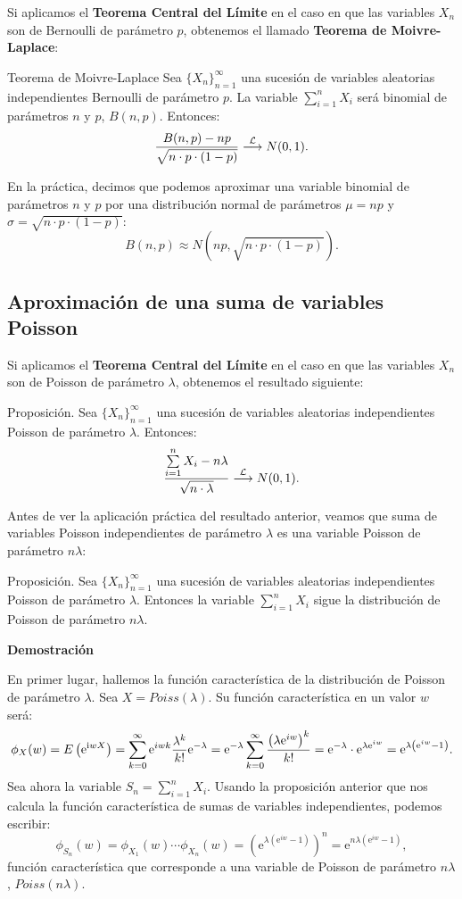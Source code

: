 \documentclass[
  letterpaper,
  DIV=11,
  numbers=noendperiod]{scrreprt}
\begin{document}
Si aplicamos el \textbf{Teorema Central del Límite} en el caso en que
las variables \(X_n\) son de Bernoulli de parámetro \(p\), obtenemos el
llamado \textbf{Teorema de Moivre-Laplace}:

Teorema de Moivre-Laplace Sea \(\{X_n\}_{n=1}^\infty\) una sucesión de
variables aleatorias independientes Bernoulli de parámetro \(p\). La
variable \(\sum\limits_{i=1}^n X_i\) será binomial de parámetros \(n\) y
\(p\), \(B(n,p)\). Entonces: \[
\frac{B(n,p)-np}{\sqrt{n\cdot p\cdot (1-p)}}\stackrel{{\cal L}}{\longrightarrow} N(0,1).
\]

En la práctica, decimos que podemos aproximar una variable binomial de
parámetros \(n\) y \(p\) por una distribución normal de parámetros
\(\mu=np\) y \(\sigma =\sqrt{n\cdot p\cdot (1-p)}\): \[
B(n,p)\approx N(np,\sqrt{n\cdot p\cdot (1-p)}).
\]

\hypertarget{aproximaciuxf3n-de-una-suma-de-variables-poisson}{%
\subsection{Aproximación de una suma de variables
Poisson}\label{aproximaciuxf3n-de-una-suma-de-variables-poisson}}

Si aplicamos el \textbf{Teorema Central del Límite} en el caso en que
las variables \(X_n\) son de Poisson de parámetro \(\lambda\), obtenemos
el resultado siguiente:

Proposición. Sea \(\{X_n\}_{n=1}^\infty\) una sucesión de variables
aleatorias independientes Poisson de parámetro \(\lambda\). Entonces: \[
\frac{\sum\limits_{i=1}^n X_i -n\lambda}{\sqrt{n\cdot \lambda}}\stackrel{{\cal L}}{\longrightarrow} N(0,1).
\]

Antes de ver la aplicación práctica del resultado anterior, veamos que
suma de variables Poisson independientes de parámetro \(\lambda\) es una
variable Poisson de parámetro \(n\lambda\):

Proposición. Sea \(\{X_n\}_{n=1}^\infty\) una sucesión de variables
aleatorias independientes Poisson de parámetro \(\lambda\). Entonces la
variable \(\sum\limits_{i=1}^n X_i\) sigue la distribución de Poisson de
parámetro \(n\lambda\).

\textbf{Demostración}

En primer lugar, hallemos la función característica de la distribución
de Poisson de parámetro \(\lambda\). Sea \(X=Poiss(\lambda)\). Su
función característica en un valor \(w\) será: \[
\scriptsize{
\phi_X(w)=E\left(\mathrm{e}^{\mathrm{i} w X}\right)=\sum_{k=0}^\infty \mathrm{e}^{i w k}\frac{\lambda^k}{k!}\mathrm{e}^{-\lambda}=\mathrm{e}^{-\lambda} \sum_{k=0}^\infty \frac{\left(\lambda\mathrm{e}^{iw}\right)^k}{k!}=\mathrm{e}^{-\lambda}\cdot \mathrm{e}^{\lambda\mathrm{e}^{iw}}=\mathrm{e}^{\lambda \left(\mathrm{e}^{iw}-1\right)}.
}
\] Sea ahora la variable \(S_n=\sum\limits_{i=1}^n X_i\). Usando la
proposición anterior que nos calcula la función característica de sumas
de variables independientes, podemos escribir: \[
\phi_{S_n}(w)=\phi_{X_1}(w)\cdots \phi_{X_n}(w)=\left(\mathrm{e}^{\lambda \left(\mathrm{e}^{iw}-1\right)}\right)^n =\mathrm{e}^{n\lambda \left(\mathrm{e}^{iw}-1\right)},
\] función característica que corresponde a una variable de Poisson de
parámetro \(n\lambda\), \(Poiss(n\lambda)\).
\end{document}
